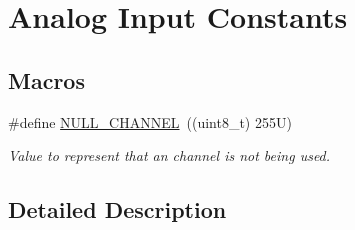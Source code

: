 \hypertarget{group__analog__input__constants}{\section{Analog Input Constants}
\label{group__analog__input__constants}
}
\subsection*{Macros}
\begin{DoxyCompactItemize}
\item 
\hypertarget{group__analog__input__constants_gae3bad9f0257d0c7056e81f3257d2ec80}{\#define \hyperlink{group__analog__input__constants_gae3bad9f0257d0c7056e81f3257d2ec80}{N\-U\-L\-L\-\_\-\-C\-H\-A\-N\-N\-E\-L}~((uint8\-\_\-t) 255\-U)}\label{group__analog__input__constants_gae3bad9f0257d0c7056e81f3257d2ec80}

\begin{DoxyCompactList}\small\item\em Value to represent that an channel is not being used. \end{DoxyCompactList}\end{DoxyCompactItemize}


\subsection{Detailed Description}
